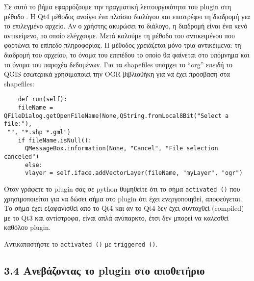 
Σε αυτό το βήμα εφαρμόζουμε την πραγματική λειτουργικότητα του plugin στη μέθοδο
. Η Qt4 μέθοδος 
ανοίγει ένα πλαίσιο διαλόγου και επιστρέφει τη διαδρομή για το επιλεγμένο αρχείο. Αν ο χρήστης ακυρώσει το διάλογο, η διαδρομή είναι ένα κενό αντικείμενο, το οποίο ελέγχουμε. Μετά καλούμε τη μέθοδο  του αντικειμένου που φορτώνει το επίπεδο πληροφορίας. Η μέθοδος χρειάζεται μόνο τρία αντικέιμενα: τη διαδρομή του αρχείου, το όνομα του επιπέδου το οποίο θα φαίνεται στο υπόμνημα και το όνομα του παροχέα δεδομένων. Για τα shapefiles υπάρχει το “org” επειδή το QGIS εσωτερικά χρησιμοποιεί την OGR βιβλιοθήκη για να έχει προσβαση στα shapefiles: 

\begin{verbatim}
    def run(self):
    fileName = QFileDialog.getOpenFileName(None,QString.fromLocal8Bit("Select a file:"),
 "", "*.shp *.gml")
    if fileName.isNull():
      QMessageBox.information(None, "Cancel", "File selection canceled")
      else:
      vlayer = self.iface.addVectorLayer(fileName, "myLayer", "ogr")
\end{verbatim}


Όταν γράφετε το plugin σας σε python θυμηθείτε ότι το σήμα \texttt{activated ()}
που χρησιμοποιείται για να δώσει σήμα στο plugin ότι έχει ενεργοποιηθεί, αποφεύγεται. Το σήμα έχει εξαφανισθεί απο το Qt4 και αν το Qt4 δεν έχει συνταχθεί (compiled) με το Qt3 και αντίστροφα, είναι απλά ανύπαρκτο, έτσι δεν μπορεί να καλεσθεί καθόλου plugin.

Αντικαταστήστε το \texttt{activated ()} με \texttt{triggered ()}.

\subsection{3.4 Ανεβάζοντας το plugin στο αποθετήριο}

